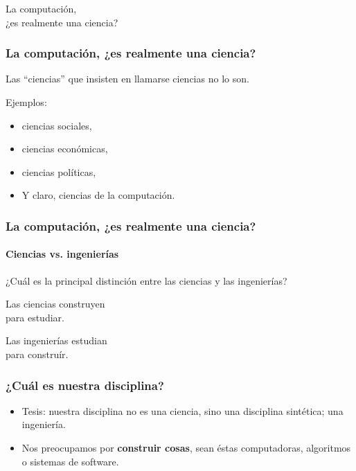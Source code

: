 \documentclass[spanish]{beamer}
\begin{document}
\begin{frame}
  \begin{center}
    \Huge{
      La computación,\\
      ¿es realmente una ciencia?
    }
  \end{center}
\end{frame}

\begin{frame}
  \frametitle{La computación, ¿es realmente una ciencia?}

  Las ``ciencias'' que insisten en llamarse ciencias no lo son.

  \pause

  Ejemplos:

  \pause

  \begin{itemize}
    \item ciencias sociales, \pause
    \item ciencias económicas, \pause
    \item ciencias políticas, \pause
    \item Y claro, ciencias de la computación.
  \end{itemize}
\end{frame}

\begin{frame}
  \frametitle{La computación, ¿es realmente una ciencia?}
  \framesubtitle{Ciencias vs. ingenierías}

  \pause

  ¿Cuál es la principal distinción entre las ciencias y las ingenierías?
\end{frame}

\begin{frame}
  \begin{center}
    \Huge{
      Las ciencias construyen \\
      para estudiar.

      \vspace{2em}

      Las ingenierías estudian \\
      para construír.
    }
  \end{center}
\end{frame}

\begin{frame}
  \frametitle{¿Cuál es nuestra disciplina?}

  \pause

  \begin{itemize}
    \item Tesis: nuestra disciplina no es una ciencia, sino una disciplina
      sintética; una ingeniería.
    \pause

    \item Nos preocupamos por \textbf{construir cosas}, sean éstas
      computadoras, algoritmos o sistemas de software.
  \end{itemize}
\end{frame}
\end{document}

